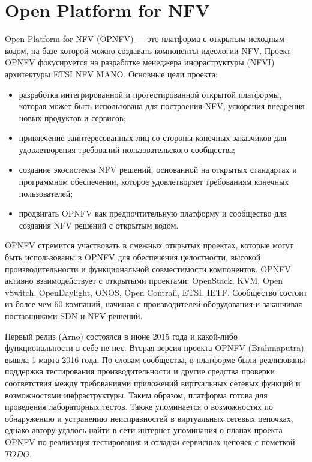 \documentclass[oneside,final,14pt,a4paper]{extreport}
\begin{document}
\section{Open Platform for NFV}
Open Platform for NFV (OPNFV) --- это платформа с открытым исходным кодом, на базе которой можно создавать компоненты  идеологии NFV. Проект OPNFV фокусируется на разработке менеджера инфраструктуры (NFVI) архитектуры ETSI NFV MANO\cite{opnfv-official}. Основные цели проекта:
\begin{itemize}
	\item разработка интегрированной и протестированной открытой платформы, которая может быть использована для построения NFV, ускорения внедрения новых продуктов и сервисов;
	\item привлечение заинтересованных лиц со стороны конечных заказчиков для удовлетворения требований пользовательского сообщества;
	\item создание экосистемы NFV решений, основанной на открытых стандартах и программном обеспечении, которое удовлетворяет требованиям конечных пользователей;
	\item продвигать OPNFV как предпочтительную платформу и сообщество для создания NFV решений с открытым кодом.
\end{itemize}

OPNFV стремится участвовать в смежных открытых проектах, которые могут быть использованы в OPNFV для обеспечения целостности, высокой производительности и функциональной совместимости компонентов. OPNFV активно взаимодействует с открытыми проектами: OpenStack, KVM, Open vSwitch, OpenDaylight, ONOS, Open Contrail, ETSI, IETF. Сообщество состоит из более чем 60 компаний, начиная с производителей оборудования и заканчивая поставщиками SDN и NFV решений.\cite{opnfv-state1}

Первый релиз (Arno) состоялся в июне 2015 года и какой-либо функциональности в себе не нес.
Вторая версия проекта OPNFV (Brahmaputra) вышла 1 марта 2016 года. По словам сообщества, в платформе были реализованы поддержка тестирования производительности и другие средства проверки соответствия между требованиями приложений виртуальных сетевых функций и возможностями инфраструктуры. Таким образом, платформа готова для проведения лабораторных тестов. Также упоминается о возможностях по обнаружению и устранению неисправностей в виртуальных сетевых цепочках, однако автору удалось найти в сети интернет упоминания о планах проекта OPNFV по реализация тестирования и отладки сервисных цепочек с пометкой $TODO$\cite{bib:opnfv_testing_todo}.
\end{document}
